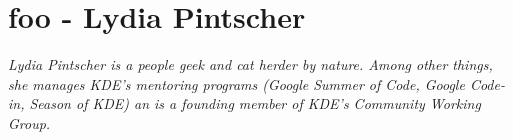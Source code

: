\chapter{foo - Lydia Pintscher}

\textit{Lydia Pintscher is a people geek and cat herder by nature. Among other things, she manages KDE's mentoring programs (Google Summer of Code, Google Code-in, Season of KDE) an is a founding member of KDE's Community Working Group.}
